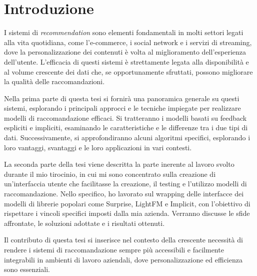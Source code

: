 \chapter{Introduzione}

I sistemi di \textit{recommendation} sono elementi fondamentali in molti settori legati alla vita quotidiana, come l'e-commerce, i social network e i servizi di streaming, dove la personalizzazione dei contenuti è volta al miglioramento dell'esperienza dell'utente. L'efficacia di questi sistemi è strettamente legata alla disponibilità e al volume crescente dei dati che, se opportunamente sfruttati, possono migliorare la qualità delle raccomandazioni.

Nella prima parte di questa tesi si fornirà una panoramica generale su questi sistemi, esplorando i principali approcci e le tecniche impiegate per realizzare modelli di raccomandazione efficaci. Si tratteranno i modelli basati su feedback espliciti e impliciti, esaminando le caratteristiche e le differenze tra i due tipi di dati. Successivamente, si approfondiranno alcuni algoritmi specifici, esplorando i loro vantaggi, svantaggi e le loro applicazioni in vari contesti.

La seconda parte della tesi viene descritta la parte inerente al lavoro svolto durante il mio tirocinio, in cui mi sono concentrato sulla creazione di un'interfaccia utente che facilitasse la creazione, il testing e l'utilizzo modelli di raccomandazione. Nello specifico, ho lavorato sul wrapping delle interfacce dei modelli di librerie popolari come Surprise, LightFM e Implicit, con l’obiettivo di rispettare i vincoli specifici imposti dalla mia azienda. Verranno discusse le sfide affrontate, le soluzioni adottate e i risultati ottenuti.

Il contributo di questa tesi si inserisce nel contesto della crescente necessità di rendere i sistemi di raccomandazione sempre più accessibili e facilmente integrabili in ambienti di lavoro aziendali, dove personalizzazione ed efficienza sono essenziali.
